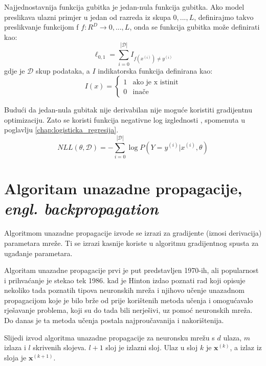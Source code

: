 \documentclass[times, utf8, diplomski, numeric]{fer}
\newcommand{\abs}[1]{\left\lvert#1\right\rvert}
\begin{document}
Najjednostavnija funkcija gubitka je jedan-nula funkcija gubitka. Ako model preslikava ulazni primjer u jedan od razreda iz skupa ${0, ..., L}$, definirajmo takvo preslikvanje funkcijom f $f: R^D \rightarrow {0, ..., L}$, onda se funkcija gubitka može definirati kao:
\begin{equation}
\ell_{0, 1} = \sum_{i = 0}^{\abs{\mathcal{D}}} I_{f(x^{(i)}) \neq y^{(i)}}
\end{equation}
gdje je $\mathcal{D}$ skup podataka, a $I$ indikatorska funkcija definirana kao:
\begin{equation}
I(x) =
    \left\{
	    \begin{array}{ll}
		    1  & \mbox{ako je x istinit} \\
		    0  & \mbox{inače}
	    \end{array}
    \right.
\end{equation}

Budući da jedan-nula gubitak nije derivabilan nije moguće koristiti gradijentnu optimizaciju. Zato se koristi funkcija negativne log izglednosti , spomenuta u poglavlju \ref{chap:logisticka_regresija}.
\begin{equation}
NLL(\theta, \mathcal{D}) = - \sum_{i = 0}^{\abs{\mathcal{D}}} \log P(Y = y^{(i)} | x^{(i)}, \theta)
\end{equation}


\section{Algoritam unazadne propagacije, \emph{engl. backpropagation}}
\label{chap:backpropagation}

Algoritmom unazadne propagacije izvode se izrazi za gradijente (iznosi derivacija) parametara mreže. Ti se izrazi kasnije koriste u algoritmu gradijentnog spusta za ugađanje parametara.

Algoritam unazadne propagacije prvi je put predstavljen 1970-ih, ali popularnost i prihvaćanje je stekao tek 1986. kad je Hinton izdao poznati rad koji opisuje nekoliko tada poznatih tipova neuronskih mreža i njihovo učenje unazadnom propagacijom koje je bilo brže od prije korištenih metoda učenja i omogućavalo rješavanje problema, koji su do tada bili nerješivi, uz pomoć neuronskih mreža. Do danas je ta metoda učenja postala najproučavanija i nakorištenija.

Slijedi izvod algoritma unazadne propagacije za neuronsku mrežu s $d$ ulaza, $m$ izlaza i $l$ skrivenih slojeva. $l+1$ sloj je izlazni sloj.
Ulaz u sloj $k$ je $\boldsymbol{x}^{(k)}$, a izlaz iz sloja je $\boldsymbol{x}^{(k+1)}$.
\end{document}
